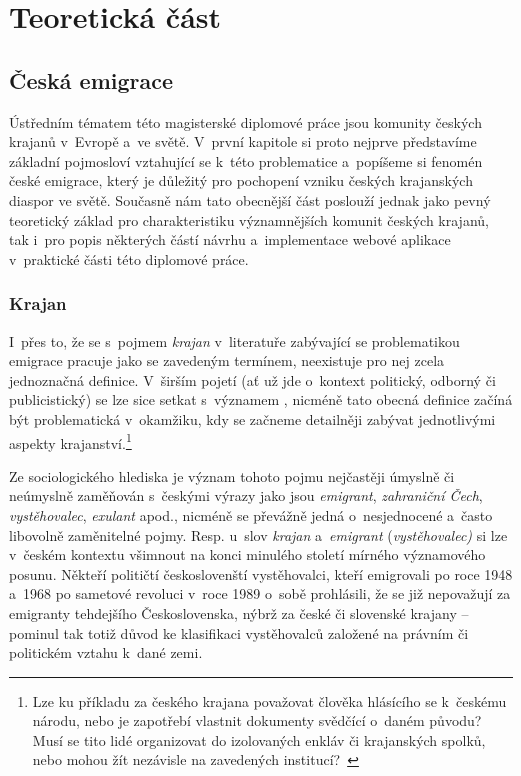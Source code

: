 \part{Teoretická část}

\hypertarget{ux10deskuxe1-emigrace}{%
\chapter{Česká emigrace}\label{ux10deskuxe1-emigrace}}

Ústředním tématem této magisterské diplomové práce jsou komunity českých krajanů v~Evropě a~ve světě. V~první kapitole si proto nejprve představíme základní pojmosloví vztahující se k~této problematice a~popíšeme si fenomén české emigrace, který je důležitý pro pochopení vzniku českých krajanských diaspor ve světě. Současně nám tato obecnější část poslouží jednak jako pevný teoretický základ pro charakteristiku významnějších komunit českých krajanů, tak i~pro popis některých částí návrhu a~implementace webové aplikace v~praktické části této diplomové práce.

\hypertarget{krajan}{%
\section{Krajan}\label{krajan}}

I~přes to, že se s~pojmem \emph{krajan} v~literatuře zabývající se problematikou emigrace pracuje jako se zavedeným termínem, neexistuje pro nej zcela jednoznačná definice. V~širším pojetí (ať už jde o~kontext politický, odborný či publicistický) se lze sice setkat s~významem , nicméně tato obecná definice začíná být problematická v~okamžiku, kdy se začneme detailněji zabývat jednotlivými aspekty krajanství.\footnote{Lze ku příkladu za českého krajana považovat člověka hlásícího se k~českému národu, nebo je zapotřebí vlastnit dokumenty svědčící o~daném původu? Musí se tito lidé organizovat do izolovaných enkláv či krajanských spolků, nebo mohou žít nezávisle na zavedených institucí?~\parencite{Jakoubek2015}}~\parencite{Jakoubek2015}

Ze sociologického hlediska je význam tohoto pojmu nejčastěji úmyslně či neúmyslně zaměňován s~českými výrazy jako jsou \emph{emigrant}, \emph{zahraniční Čech}, \emph{vystěhovalec}, \emph{exulant} apod., nicméně se převážně jedná o~nesjednocené a~často libovolně zaměnitelné pojmy. Resp. u~slov \emph{krajan} a~\emph{emigrant} (\emph{vystěhovalec)} si lze v~českém kontextu všimnout na konci minulého století mírného významového posunu. Někteří političtí českoslovenští vystěhovalci, kteří emigrovali po roce 1948 a~1968 po sametové revoluci v~roce 1989 o~sobě prohlásili, že se již nepovažují za emigranty tehdejšího Československa, nýbrž za české či slovenské krajany -- pominul tak totiž důvod ke klasifikaci vystěhovalců založené na právním či politickém vztahu k~dané zemi.~\parencite{Broucek2017}


